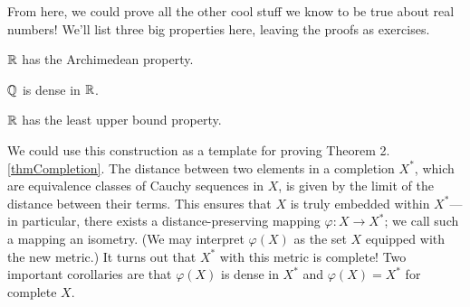 \documentclass[../m131main.tex]{subfiles}
\begin{document}
From here, we could prove all the other cool stuff we know to be true about real numbers!
We'll list three big properties here, leaving the proofs as exercises.

\begin{theorem}
    $\R$ has the Archimedean property.
\end{theorem}

\begin{theorem}[Density of $\Q$ in $\R$]
    $\Q$ is dense in $\R$.
\end{theorem}

\begin{theorem}[Completeness]
    $\R$ has the least upper bound property.
\end{theorem}

We could use this construction as a template for proving Theorem 2.\ref{thmCompletion}.
The distance between two elements in a completion $X^*$, which are equivalence classes of Cauchy sequences in $X$, is given by the limit of the distance between their terms.
This ensures that $X$ is truly embedded within $X^*$---in particular, there exists a distance-preserving mapping $\varphi : X \to X^*$; we call such a mapping an isometry.
(We may interpret $\varphi(X)$ as the set $X$ equipped with the new metric.)
It turns out that $X^*$ with this metric is complete!
Two important corollaries are that $\varphi(X)$ is dense in $X^*$ and $\varphi(X) = X^*$ for complete $X$.



\end{document}
